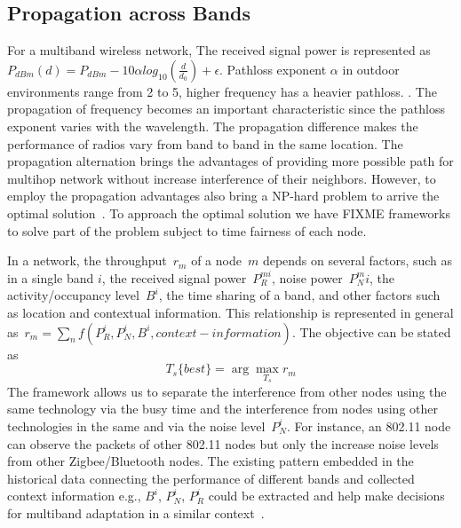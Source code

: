 \subsection{Propagation across Bands}
For a multiband wireless network, 
The received signal power is represented as $P_{dBm}(d)=P_{dBm}-10\alpha log_{10}(\frac{d}{d_0})+\epsilon$. Pathloss exponent $\alpha$ in outdoor environments range from 2 to 5, higher frequency has a heavier pathloss. \cite{camp2006measurement}. 
The propagation of frequency becomes an important characteristic since the pathloss exponent varies with the wavelength. The propagation difference makes the performance of radios vary from band to band in the same location. The propagation alternation brings the advantages of providing more possible path for multihop network without increase interference of their neighbors. 
However, to employ the propagation advantages also bring a NP-hard problem to arrive the optimal solution~\cite{arkoulis2013optimal}. To approach the optimal solution we have FIXME frameworks to solve part of the problem subject to time fairness of each node.


In a network, the throughput~$r_m$ of a node~$m$ depends on several factors, such as in a single band $i$, the received signal power~$P_R^{mi}$, noise power~$P_N^mi$, the activity/occupancy level~$B^i$, the time sharing of a band, and other factors such as location and contextual information. 
This relationship is represented in general as~$r_m =\sum_n{f(P_R^i,P_N^i,B^i,context-information)}$. The objective can be stated as
\begin{equation}
T_s\{best\}= \arg \max_{T_s} r_m 
\end{equation}
The framework allows us to 
separate the interference from other nodes using the same technology via the busy time and the interference from nodes using other technologies in the same and via the noise level~$P_N^i$. 
For instance, an 802.11 node can observe the packets of other 802.11 nodes but only the increase noise levels from other Zigbee/Bluetooth nodes.
The existing pattern embedded in the historical data connecting 
the performance of different bands and collected context information 
e.g.,  $B^i$, $P_N^i$, $P_R^i$ 
could be extracted and help make decisions
for multiband adaptation in a similar context~\cite{meikle2012global}.






